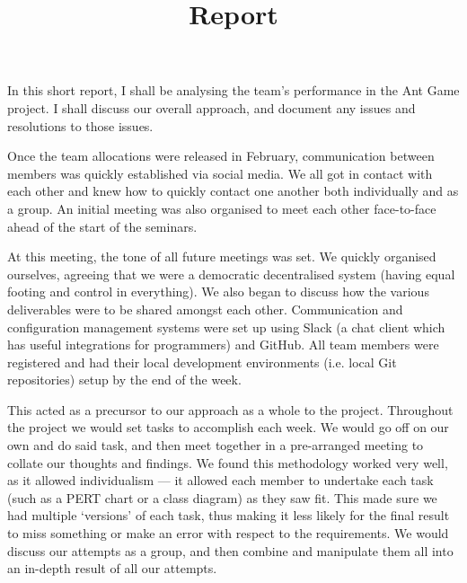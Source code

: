\documentclass[11pt]{article}
\title{Report}
\date{}
\begin{document}
\maketitle

In this short report, I shall be analysing the team's performance in the Ant Game project. I shall discuss our overall approach, and document any issues and resolutions to those issues.

Once the team allocations were released in February, communication between members was quickly established via social media. We all got in contact with each other and knew how to quickly contact one another both individually and as a group. An initial meeting was also organised to meet each other face-to-face ahead of the start of the seminars.

At this meeting, the tone of all future meetings was set. We quickly organised ourselves, agreeing that we were a democratic decentralised system (having equal footing and control in everything). We also began to discuss how the various deliverables were to be shared amongst each other. Communication and configuration management systems were set up using Slack (a chat client which has useful integrations for programmers) and GitHub.  All team members were registered and had their local development environments (i.e. local Git repositories) setup by the end of the week.

This acted as a precursor to our approach as a whole to the project. Throughout the project we would set tasks to accomplish each week. We would go off on our own and do said task, and then meet together in a pre-arranged meeting to collate our thoughts and findings. We found this methodology worked very well, as it allowed individualism --- it allowed each member to undertake each task (such as a PERT chart or a class diagram) as they saw fit. This made sure we had multiple `versions' of each task, thus making it less likely for the final result to miss something or make an error with respect to the requirements. We would discuss our attempts as a group, and then combine and manipulate them all into an in-depth result of all our attempts.
\end{document}
